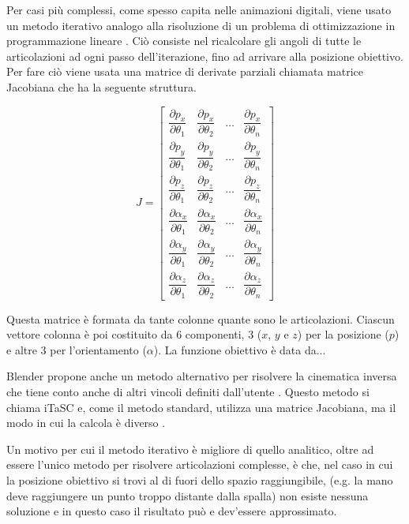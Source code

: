 Per casi più complessi, come spesso capita nelle animazioni digitali, viene usato un metodo iterativo  analogo alla risoluzione di un problema di ottimizzazione in programmazione lineare \cite{lp2017}.
Ciò consiste nel ricalcolare gli angoli di tutte le articolazioni ad ogni passo dell'iterazione, fino ad arrivare alla posizione obiettivo.
Per fare ciò viene usata una matrice di derivate parziali chiamata matrice Jacobiana \cite{Parent:2012:CAA:2385444} che ha la seguente struttura.

\[J=
\begin{bmatrix}
    \dfrac{\partial p_x}{\partial \theta_1} & \dfrac{\partial p_x}{\partial \theta_2} & \dots & \dfrac{\partial p_x}{\partial \theta_n} \\[2ex]
    \dfrac{\partial p_y}{\partial \theta_1} & \dfrac{\partial p_y}{\partial \theta_2} & \dots & \dfrac{\partial p_y}{\partial \theta_n} \\[2ex]
    \dfrac{\partial p_z}{\partial \theta_1} & \dfrac{\partial p_z}{\partial \theta_2} & \dots & \dfrac{\partial p_z}{\partial \theta_n} \\[2ex]
    \dfrac{\partial \alpha_x}{\partial \theta_1} & \dfrac{\partial \alpha_x}{\partial \theta_2} & \dots & \dfrac{\partial \alpha_x}{\partial \theta_n} \\[2ex]
    \dfrac{\partial \alpha_y}{\partial \theta_1} & \dfrac{\partial \alpha_y}{\partial \theta_2} & \dots & \dfrac{\partial \alpha_y}{\partial \theta_n} \\[2ex]
    \dfrac{\partial \alpha_z}{\partial \theta_1} & \dfrac{\partial \alpha_z}{\partial \theta_2} & \dots & \dfrac{\partial \alpha_z}{\partial \theta_n} 
\end{bmatrix}
\]

Questa matrice è formata da tante colonne quante sono le articolazioni. Ciascun vettore colonna è poi costituito da 6 componenti, 3 ($x$, $y$ e $z$) per la posizione ($p$) e altre 3 per l'orientamento ($\alpha$).
La funzione obiettivo è data da...

Blender propone anche un metodo alternativo per risolvere la cinematica inversa che tiene conto anche di altri vincoli definiti dall'utente \cite{blendDoc}. Questo metodo si chiama iTaSC e, come il metodo standard, utilizza una matrice Jacobiana, ma il modo in cui la calcola è diverso \cite{blendWiki}.

Un motivo per cui il metodo iterativo è migliore di quello analitico, oltre ad essere l'unico metodo per risolvere articolazioni complesse, è che, nel caso in cui la posizione obiettivo si trovi al di fuori dello spazio raggiungibile, (e.g. la mano deve raggiungere un punto troppo distante dalla spalla) non esiste nessuna soluzione e in questo caso il risultato può e dev'essere approssimato.

